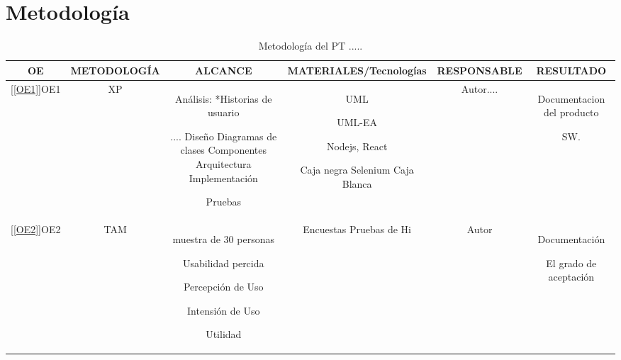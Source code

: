 \chapter{Metodología}

\begin{table}
    \centering
    \begin{tabular}{|c|c|c|c|c|c|} \hline 
         OE&  METODOLOGÍA&  ALCANCE&  MATERIALES/Tecnologías&  RESPONSABLE& RESULTADO\\ \hline 
         \ref{[OE1]}OE1&  XP&  Análisis:
*Historias de usuario

....
Diseño
Diagramas de clases
Componentes
Arquitectura
Implementación

Pruebas&  UML




UML-EA




Nodejs, React

Caja negra
Selenium
Caja Blanca
&  Autor....& Documentacion del producto

SW.\\ \hline 
         \ref{[OE2]}OE2&  TAM&  muestra de 30 personas

Usabilidad percida

Percepción de Uso

Intensión de Uso

Utilidad&  Encuestas
Pruebas de Hi&  Autor

& Documentación 

El grado de aceptación\\ \hline
    \end{tabular}
    \caption{Metodología del PT .....}
    \label{tab:metodolia}
\end{table}